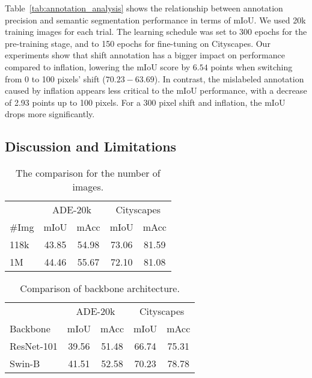 \documentclass[10pt,twocolumn,letterpaper]{article}
\begin{document}
Table~\ref{tab:annotation_analysis} shows the relationship between annotation precision and semantic segmentation performance in terms of mIoU. We used 20k training images for each trial. The learning schedule was set to 300 epochs for the pre-training stage, and to 150 epochs for fine-tuning on Cityscapes.
Our experiments show that shift annotation has a bigger impact on performance compared to inflation, lowering the mIoU score by  $6.54$ points when switching from 0 to 100 pixels' shift ($70.23 - 63.69$). In contrast, the mislabeled annotation caused by inflation appears less critical to the mIoU performance, with a decrease of 2.93 points up to 100 pixels. For a 300 pixel shift and inflation, the mIoU drops more significantly.

\subsection{Discussion and Limitations}
\begin{table}[t]
 \centering
 \caption{The comparison for the number of images. } 
    \begin{tabular}{lcccc}
      \toprule
          &\multicolumn{2}{c}{ADE-20k} & \multicolumn{2}{c}{Cityscapes} \\
         \#Img &  mIoU & mAcc & mIoU & mAcc \\
        \bottomrule[0.5pt]
         118k&43.85 &54.98 & 73.06 & 81.59    \\
       1M& 44.46 &55.67& 72.10&81.08  \\
        \bottomrule[0.8pt]
 \end{tabular}
\label{tab:image_size}
\end{table}

\begin{table}[t]
  \centering
  \caption{Comparison of backbone architecture.}
  \begin{tabular}{lcccc}
    \toprule
     & \multicolumn{2}{c}{ADE-20k}& \multicolumn{2}{c}{Cityscapes}\\
     Backbone   &mIoU&mAcc&mIoU&mAcc\\
    \midrule
       ResNet-101&39.56&51.48&66.74&75.31 \\
       Swin-B &41.51&52.58&70.23& 78.78 \\
    \bottomrule
  \end{tabular}
  \label{tab:backbone_compare}
  \vspace{-5pt}
\end{table}
\end{document}
